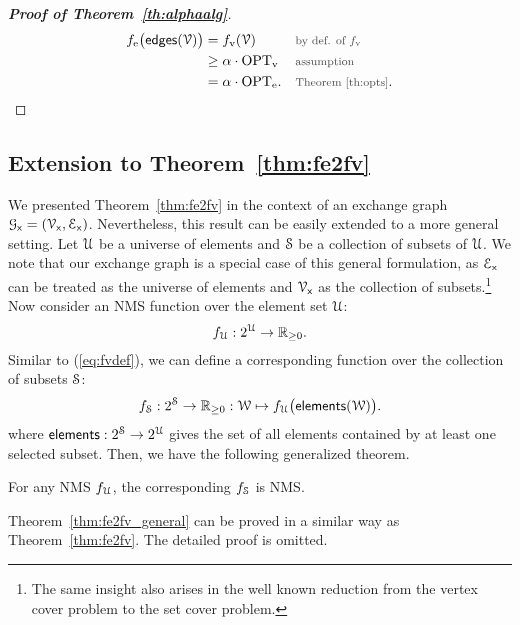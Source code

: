 \documentclass[conference]{IEEEtran}
\begin{document}
\vspace{0.5cm}
\begin{proof}[\bfseries Proof of Theorem~\ref{th:alphaalg}]
  \begin{align}
	\fe\big(\edg(\VV)\big) & = \fv(\VV) && \ptext{by def. of $\fv$}\\
	& \geq \alpha \cdot \OPTv && \ptext{assumption}\\
	& = \alpha \cdot \OPTe. && \ptext{Theorem~\ref{th:opts}}.
	\label{}
  \end{align}
\end{proof}

\subsection{Extension to Theorem~\ref{thm:fe2fv}}
We presented Theorem~\ref{thm:fe2fv} in the context of an exchange graph $\mathcal{G}_\mathsf{x} = (\mathcal{V}_\mathsf{x}, \mathcal{E}_\mathsf{x})$.
Nevertheless, this result can be easily extended to a more general setting. 
Let $\mathcal{U}$ be a universe of elements and $\mathcal{S}$ be a collection of subsets of $\mathcal{U}$.
We note that our exchange graph is a special case of this general formulation,
as $\mathcal{E}_\mathsf{x}$ can be treated as the universe of elements and 
$\mathcal{V}_\mathsf{x}$ as the collection of subsets.\footnote{
The same insight also arises in the well known reduction from the vertex cover problem to the set cover problem.}
Now consider an NMS function over the element set $\mathcal{U}$:
\begin{equation}
f_{\mathcal{U}}: 2^{\mathcal{U}} \to \mathbb{R}_{\geq 0}.
\end{equation}
Similar to (\ref{eq:fvdef}), we can define a corresponding function over the collection of subsets $\mathcal{S}$:
\begin{equation}
f_{\mathcal{S}} : 2^{\mathcal{S}} \to \mathbb{R}_{\geq 0 }: \mathcal{W} \mapsto
  f_{\mathcal{U}}\big(\mathsf{elements}(\mathcal{W})\big).
\end{equation}
where $\mathsf{elements} : 2^{\mathcal{S}} \to 2^{\mathcal{U}}$ gives the set of all elements 
contained by at least one selected subset.
Then, we have the following generalized theorem.
\begin{theorem}
  \normalfont
  For any NMS $f_{\mathcal{U}}$, the corresponding $f_{\mathcal{S}}$ is NMS.
  \label{thm:fe2fv_general}
\end{theorem}
Theorem~\ref{thm:fe2fv_general} can be proved in a similar way as Theorem~\ref{thm:fe2fv}. The detailed proof is omitted. 
\end{document}

